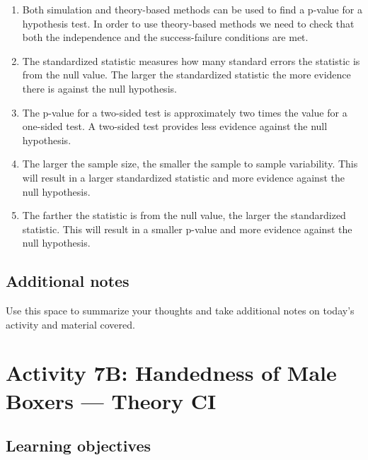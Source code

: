 \documentclass[
]{report}
\begin{document}
\begin{enumerate}
\def\labelenumi{\arabic{enumi}.}
\item
  Both simulation and theory-based methods can be used to find a p-value for a hypothesis test. In order to use theory-based methods we need to check that both the independence and the success-failure conditions are met.
\item
  The standardized statistic measures how many standard errors the statistic is from the null value. The larger the standardized statistic the more evidence there is against the null hypothesis.
\item
  The p-value for a two-sided test is approximately two times the value for a one-sided test. A two-sided test provides less evidence against the null hypothesis.
\item
  The larger the sample size, the smaller the sample to sample variability. This will result in a larger standardized statistic and more evidence against the null hypothesis.
\item
  The farther the statistic is from the null value, the larger the standardized statistic. This will result in a smaller p-value and more evidence against the null hypothesis.
\end{enumerate}

\newpage

\hypertarget{additional-notes-10}{%
\subsection{Additional notes}\label{additional-notes-10}}

Use this space to summarize your thoughts and take additional notes on today's activity and material covered.

\newpage

\hypertarget{activity-7b-handedness-of-male-boxers-theory-ci}{%
\section{Activity 7B: Handedness of Male Boxers --- Theory CI}\label{activity-7b-handedness-of-male-boxers-theory-ci}}


\hypertarget{learning-objectives}{%
\subsection{Learning objectives}\label{learning-objectives}}
\end{document}
